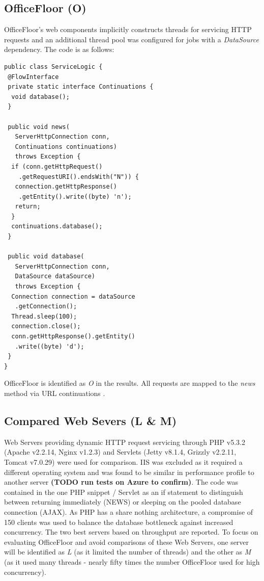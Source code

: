 \documentclass[conference]{ieee/IEEEtran}
\begin{document}
\subsection{OfficeFloor (O)}
OfficeFloor's web components implicitly constructs threads for servicing HTTP
requests and an additional thread pool was configured for jobs with a
\textit{DataSource} dependency.  The code is as follows:

\begin{verbatim}
public class ServiceLogic {
 @FlowInterface
 private static interface Continuations {
  void database();
 }

 public void news(
   ServerHttpConnection conn, 
   Continuations continuations) 
   throws Exception { 
  if (conn.getHttpRequest()
    .getRequestURI().endsWith("N")) {
   connection.getHttpResponse()
    .getEntity().write((byte) 'n');
   return;
  }
  continuations.database();
 }

 public void database(
   ServerHttpConnection conn,
   DataSource dataSource) 
   throws Exception {
  Connection connection = dataSource
   .getConnection();
  Thread.sleep(100);
  connection.close();
  conn.getHttpResponse().getEntity()
   .write((byte) 'd');
 }
}
\end{verbatim}
   
OfficeFloor is identified as \textit{O} in the results.  All requests are mapped
to the \textit{news} method via URL continuations \cite{url-continuation}.


\subsection{Compared Web Severs (L \& M)}
Web Servers providing dynamic HTTP request servicing through PHP v5.3.2 (Apache
v2.2.14, Nginx v1.2.3) and Servlets (Jetty v8.1.4, Grizzly v2.2.11, Tomcat
v7.0.29) were used for comparison.  IIS was excluded as it required a different
operating system and was found to be similar in performance profile to another
server \textbf{(TODO run tests on Azure to confirm)}.  The code was contained in
the one PHP snippet / Servlet as an if statement to distinguish between
returning immediately (NEWS) or sleeping on the pooled database connection
(AJAX).  As PHP has a share nothing architecture, a compromise of 150 clients
was used to balance the database bottleneck against increased concurrency.  The
two best servers based on throughput are reported. To focus on evaluating
OfficeFloor and avoid comparisons of these Web Servers, one server will be
identified as \textit{L} (as it limited the number of threads) and the other as
\textit{M} (as it used many threads - nearly fifty times the number OfficeFloor
used for high concurrency).
\end{document}
